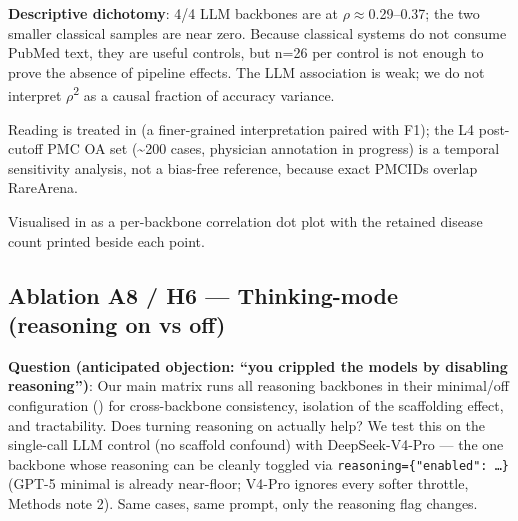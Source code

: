\textbf{Descriptive dichotomy}: 4/4 LLM backbones are at \ensuremath{\rho}\ensuremath{\approx}0.29--0.37; the two
smaller classical samples are near zero. Because classical systems do not
consume PubMed text, they are useful controls, but n=26 per control is not
enough to prove the absence of pipeline effects. The LLM association is weak;
we do not interpret \ensuremath{\rho}\textsuperscript{2} as a causal fraction of accuracy variance.

Reading is treated in  (a finer-grained interpretation paired with F1);
the L4 post-cutoff PMC OA set (\textasciitilde200 cases, physician annotation in progress)
is a temporal sensitivity analysis, not a bias-free reference, because exact
PMCIDs overlap RareArena.

Visualised in  as a per-backbone
correlation dot plot with the retained disease count printed beside each point.

\subsection{Ablation A8 / H6 --- Thinking-mode (reasoning on vs off)}\label{sec-8-10}

\textbf{Question (anticipated objection: ``you crippled the models by disabling reasoning'')}:
Our main matrix runs all reasoning backbones in their minimal/off configuration
() for cross-backbone consistency, isolation of the scaffolding effect, and
tractability. Does turning reasoning on actually help? We test this on the
single-call LLM control (no scaffold confound) with DeepSeek-V4-Pro --- the one
backbone whose reasoning can be cleanly toggled via \texttt{reasoning=\{"enabled":\ \ldots{}\}}
(GPT-5 minimal is already near-floor; V4-Pro ignores every softer throttle,
 Methods note 2). Same cases, same prompt, only the reasoning flag changes.

